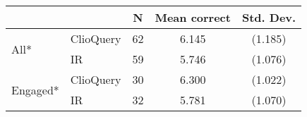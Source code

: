 \begin{tabular}{llccc}
\toprule
 &  & N & Mean correct & Std. Dev.\\
\midrule
\multirow{2}{*}{All*} & ClioQuery & 62 & 6.145 & (1.185)\\
  & IR & 59 & 5.746 & (1.076)\\\midrule
\multirow{2}{*}{Engaged*} & ClioQuery & 30 & 6.300 & (1.022)\\
  & IR & 32 & 5.781 & (1.070)\\
\bottomrule
\end{tabular}